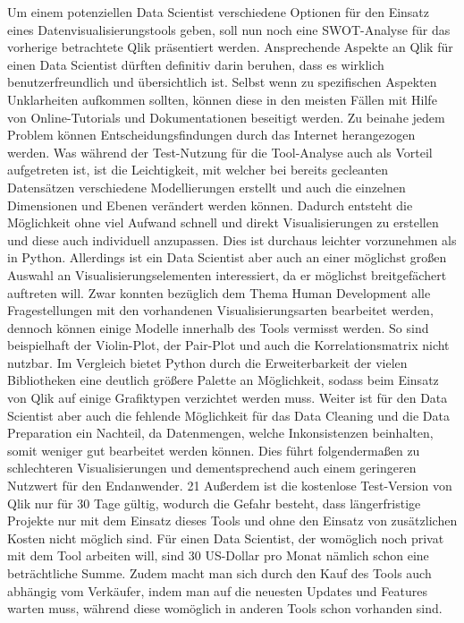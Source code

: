 \documentclass[12pt]{article}
\begin{document}
	Um einem potenziellen Data Scientist verschiedene Optionen für den Einsatz eines
	Datenvisualisierungstools geben, soll nun noch eine SWOT-Analyse für das vorherige
	betrachtete Qlik präsentiert werden.
	Ansprechende Aspekte an Qlik für einen Data Scientist dürften definitiv darin beruhen,
	dass es wirklich benutzerfreundlich und übersichtlich ist. Selbst wenn zu spezifischen
	Aspekten Unklarheiten aufkommen sollten, können diese in den meisten Fällen mit Hilfe
	von Online-Tutorials und Dokumentationen beseitigt werden. Zu beinahe jedem Problem
	können Entscheidungsfindungen durch das Internet herangezogen werden.
	Was während der Test-Nutzung für die Tool-Analyse auch als Vorteil aufgetreten ist, ist
	die Leichtigkeit, mit welcher bei bereits gecleanten Datensätzen verschiedene
	Modellierungen erstellt und auch die einzelnen Dimensionen und Ebenen verändert
	werden können.
	Dadurch entsteht die Möglichkeit ohne viel Aufwand schnell und direkt Visualisierungen
	zu erstellen und diese auch individuell anzupassen. Dies ist durchaus leichter
	vorzunehmen als in Python.
	Allerdings ist ein Data Scientist aber auch an einer möglichst großen Auswahl an
	Visualisierungselementen interessiert, da er möglichst breitgefächert auftreten will.
	Zwar konnten bezüglich dem Thema Human Development alle Fragestellungen mit den
	vorhandenen Visualisierungsarten bearbeitet werden, dennoch können einige Modelle
	innerhalb des Tools vermisst werden. So sind beispielhaft der Violin-Plot, der Pair-Plot
	und auch die Korrelationsmatrix nicht nutzbar.
	Im Vergleich bietet Python durch die Erweiterbarkeit der vielen Bibliotheken eine
	deutlich größere Palette an Möglichkeit, sodass beim Einsatz von Qlik auf einige
	Grafiktypen verzichtet werden muss.
	Weiter ist für den Data Scientist aber auch die fehlende Möglichkeit für das Data
	Cleaning und die Data Preparation ein Nachteil, da Datenmengen, welche
	Inkonsistenzen beinhalten, somit weniger gut bearbeitet werden können. Dies führt
	folgendermaßen zu schlechteren Visualisierungen und dementsprechend auch einem
	geringeren Nutzwert für den Endanwender.
	21
	Außerdem ist die kostenlose Test-Version von Qlik nur für 30 Tage gültig, wodurch die
	Gefahr besteht, dass längerfristige Projekte nur mit dem Einsatz dieses Tools und ohne
	den Einsatz von zusätzlichen Kosten nicht möglich sind. Für einen Data Scientist, der
	womöglich noch privat mit dem Tool arbeiten will, sind 30 US-Dollar pro Monat nämlich
	schon eine beträchtliche Summe.
	Zudem macht man sich durch den Kauf des Tools auch abhängig vom Verkäufer, indem
	man auf die neuesten Updates und Features warten muss, während diese womöglich in
	anderen Tools schon vorhanden sind.
	
\end{document}
